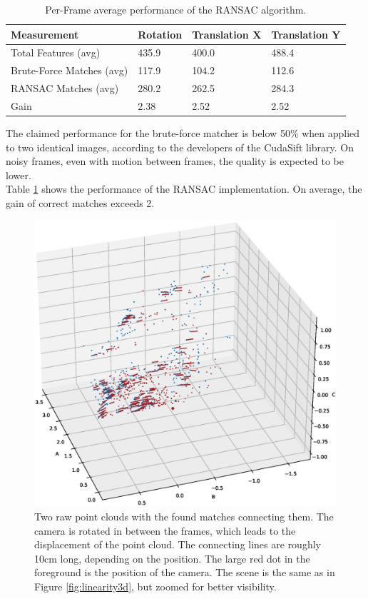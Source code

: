 \begin{table}[ht] \centering
	\begin{tabular}{|p{5cm}|p{3cm}|p{3cm}|p{3cm}|} \hline
		\rowcolor{gray} Measurement & Rotation & Translation X & Translation Y \\
		\hline
		Total Features (avg) & 435.9 & 400.0 & 488.4\\
		\hline
		Brute-Force Matches (avg) & 117.9 & 104.2 & 112.6  \\
		\hline
		RANSAC Matches (avg) & 280.2 & 262.5 & 284.3  \\
		\hline
    Gain & 2.38 & 2.52 & 2.52  \\
		\hline
	\end{tabular}
	\caption{Per-Frame average performance of the RANSAC algorithm.}
	\label{tab:ransac_performance}
 \end{table}
 The claimed performance for the brute-force matcher is below 50\% when applied to two identical images, according to the developers of the CudaSift library.\cite{cudaSiftRepo} On noisy frames, even with motion between frames, the quality is expected to be lower.\\
 Table \ref{tab:ransac_performance} shows the performance of the RANSAC implementation. On average, the gain of correct matches exceeds 2. 

\begin{figure}[H]
  \centering
  \includegraphics[width=1.0\textwidth,trim={7cm 7cm 8cm 5cm},clip]{images/3d_features_rotation.eps}
  \caption{Two raw point clouds with the found matches connecting them. The camera is rotated in between the frames, which leads to the displacement of the point cloud. The connecting lines are roughly 10cm long, depending on the position. The large red dot in the foreground is the position of the camera. The scene is the same as in Figure \ref{fig:linearity3d}, but zoomed for better visibility.}
  \label{im:3d_features_rotation}
\end{figure}
